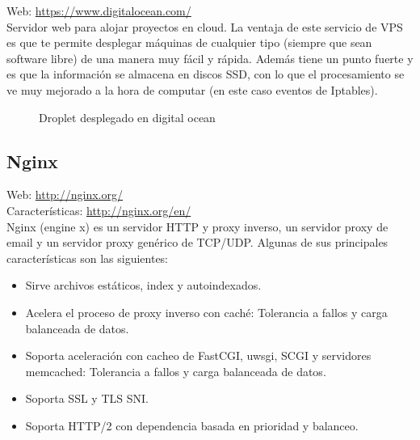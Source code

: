 Web: \url{https://www.digitalocean.com/}\\

Servidor web para alojar proyectos en cloud. La ventaja de este servicio de VPS es que te permite desplegar máquinas de cualquier tipo (siempre que sean software libre) de una manera muy fácil y rápida. Además tiene un punto fuerte y es que la información se almacena en discos SSD, con lo que el procesamiento se ve muy mejorado a la hora de computar (en este caso eventos de Iptables).\\

\begin{figure}[H]
\caption{Droplet desplegado en digital ocean}
\end{figure}

\subsection{Nginx}


Web: \url{http://nginx.org/}\\
Características: \url{http://nginx.org/en/}\\

Nginx (engine x) es un servidor HTTP y proxy inverso, un servidor proxy de email y un servidor proxy genérico de TCP/UDP. Algunas de sus principales características son las siguientes:\\

\begin{itemize}
\item Sirve archivos estáticos, index y autoindexados.
\item Acelera el proceso de proxy inverso con caché: Tolerancia a fallos y carga balanceada de datos.
\item Soporta aceleración con cacheo de FastCGI, uwsgi, SCGI y servidores memcached: Tolerancia a fallos y carga balanceada de datos.
\item Soporta SSL y TLS SNI.
\item Soporta HTTP/2 con dependencia basada en prioridad y balanceo.
\end{itemize}

